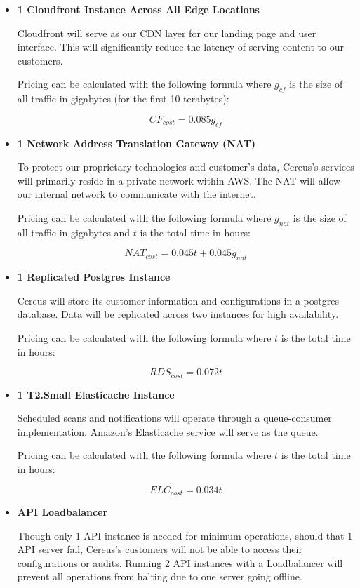 \begin{itemize}
\item \textbf{1 Cloudfront Instance Across All Edge Locations}

Cloudfront will serve as our CDN layer for our landing page and user interface. This will significantly reduce the latency of serving content to our customers.

Pricing can be calculated with the following formula where \( g_{cf} \) is the size of all traffic in gigabytes (for the first 10 terabytes):

\[ CF_{cost} = 0.085g_{cf} \]

\item \textbf{1 Network Address Translation Gateway (NAT)}

To protect our proprietary technologies and customer's data, Cereus's services will primarily reside in a private network within AWS. The NAT will allow our internal network to communicate with the internet. 

Pricing can be calculated with the following formula where \( g_{nat} \) is the size of all traffic in gigabytes and \( t \) is the total time in hours:

\[ NAT_{cost} = 0.045t + 0.045g_{nat} \]

\item \textbf{1 Replicated Postgres Instance}

Cereus will store its customer information and configurations in a postgres database. Data will be replicated across two instances for high availability.

Pricing can be calculated with the following formula where \( t \) is the total time in hours:

\[ RDS_{cost} = 0.072t \]

\item \textbf{1 T2.Small Elasticache Instance}

Scheduled scans and notifications will operate through a queue-consumer implementation. Amazon's Elasticache service will serve as the queue.

Pricing can be calculated with the following formula where \( t \) is the total time in hours:

\[ ELC_{cost} = 0.034t \]

\item \textbf{API Loadbalancer}

Though only 1 API instance is needed for minimum operations, should that 1 API server fail, Cereus's customers will not be able to access their configurations or audits. Running 2 API instances with a Loadbalancer will prevent all operations from halting due to one server going offline.


\end{itemize}
